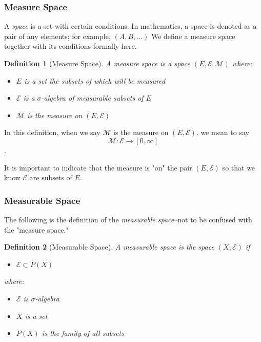 \documentclass{article}
\newtheorem{definition}{Definition}
\begin{document}
\subsubsection{Measure Space}
A \emph{space} is a set with certain conditions. In mathematics, a space is denoted as a pair of any elements; for example, $(A,B,...)$  We define a measure space together with its conditions formally here.

\begin{mdframed}
\begin{definition}[Measure Space]
A \emph{measure space} is a space $(E, \mathcal{E}, \mathcal{M} )$ where:

\begin{itemize}
    \item $E$ is a set the subsets of which will be measured
    \item $\mathcal{E}$ is a $\sigma$-algebra of measurable subsets of $E$
    \item $\mathcal{M}$ is the measure on $(E, \mathcal{E})$
\end{itemize}
\end{definition}
\end{mdframed}

In this definition, when we say $\mathcal{M}$ is the measure on $(E, \mathcal{E})$, we mean to say $$
\mathcal{M}: \mathcal{E} \rightarrow [0,\infty]
$$.

It is important to indicate that the measure is "on" the pair $(E, \mathcal{E})$ so that we know $\mathcal{E}$ are subsets of $E$.

\subsubsection{Measurable Space}
The following is the definition of the \emph{measurable space}–not to be confused with the "measure space."

\begin{mdframed}
\begin{definition}[Measurable Space]
A \emph{measurable space} is the space $(X,\mathcal{E})$ if

\begin{itemize}
    \item $\mathcal{E} \subset P(X)$
\end{itemize}

where:

\begin{itemize}
    \item $\mathcal{E}$ is $\sigma$-algebra
    \item $X$ is a set
    \item $P(X)$ is the family of all subsets
\end{itemize}
\end{definition}
\end{mdframed}
\end{document}
